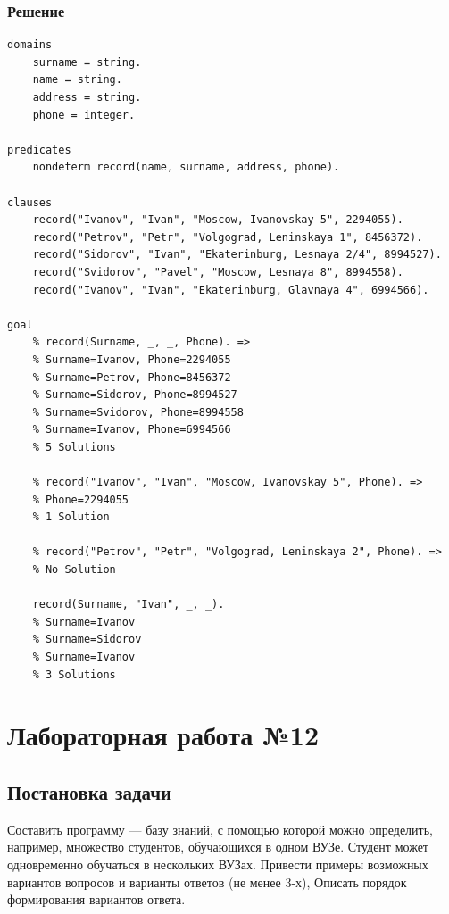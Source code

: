 \documentclass[12pt]{report}
\begin{document}
\subsection*{Решение}
\begin{lstlisting}
domains
	surname = string.
	name = string.
	address = string.
	phone = integer.

predicates
	nondeterm record(name, surname, address, phone).

clauses
	record("Ivanov", "Ivan", "Moscow, Ivanovskay 5", 2294055).
	record("Petrov", "Petr", "Volgograd, Leninskaya 1", 8456372).
	record("Sidorov", "Ivan", "Ekaterinburg, Lesnaya 2/4", 8994527).
	record("Svidorov", "Pavel", "Moscow, Lesnaya 8", 8994558).
	record("Ivanov", "Ivan", "Ekaterinburg, Glavnaya 4", 6994566).

goal
	% record(Surname, _, _, Phone). =>
	% Surname=Ivanov, Phone=2294055
	% Surname=Petrov, Phone=8456372
	% Surname=Sidorov, Phone=8994527
	% Surname=Svidorov, Phone=8994558
	% Surname=Ivanov, Phone=6994566
	% 5 Solutions
	
	% record("Ivanov", "Ivan", "Moscow, Ivanovskay 5", Phone). => 
	% Phone=2294055
	% 1 Solution
	
	% record("Petrov", "Petr", "Volgograd, Leninskaya 2", Phone). =>
	% No Solution
	
	record(Surname, "Ivan", _, _). 
	% Surname=Ivanov
	% Surname=Sidorov
	% Surname=Ivanov
	% 3 Solutions
\end{lstlisting}

\chapter*{Лабораторная работа №12}
\section*{Постановка задачи}
Составить программу — базу знаний, с помощью которой можно определить, например, множество студентов, обучающихся в одном ВУЗе. Студент может одновременно обучаться в нескольких ВУЗах. Привести примеры возможных вариантов вопросов и варианты ответов (не менее 3-х), Описать порядок формирования вариантов ответа.
\end{document}
